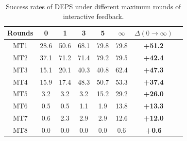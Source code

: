 \begin{table}[h]
\caption{Success rates of DEPS under different maximum rounds of interactive feedback.}
\label{tab:ablation_on_feedback}
\renewcommand\arraystretch{1.1}
\begin{center}
\begin{tabular}{@{}cccccccc@{}}
\toprule
Rounds & 0 & 1 & 3 & 5 & $\infty$ & $\Delta(0\rightarrow \infty)$ \\ \midrule
MT1 & 28.6 & 50.6 & 68.1 & 79.8 & 79.8 & \textbf{+51.2} \\
MT2 & 37.1 & 71.2 & 71.4 & 79.2 & 79.5 & \textbf{+42.4} \\
MT3 & 15.1 & 20.1 & 40.3 & 40.8 & 62.4 & \textbf{+47.3} \\
MT4 & 15.9 & 17.4 & 48.3 & 50.7 & 53.3 & \textbf{+37.4} \\
MT5 & 3.2 & 3.2 & 3.2 & 15.2 & 29.2 & \textbf{+26.0} \\
MT6 & 0.5 & 0.5 & 1.1 & 1.9 & 13.8 & \textbf{+13.3} \\
MT7 & 0.6 & 2.3 & 2.9 & 2.9 & 12.6 & \textbf{+12.0} \\
MT8 & 0.0 & 0.0 & 0.0 & 0.0 & 0.6 & \textbf{+0.6} \\ \bottomrule
\end{tabular}
\vskip -0.2in
\end{center}
\end{table}